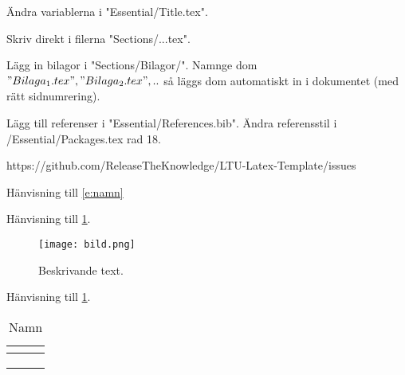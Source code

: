 Ändra variablerna i "Essential/Title.tex".

Skriv direkt i filerna "Sections/...tex".

Lägg in bilagor i "Sections/Bilagor/".
Namnge dom $"Bilaga_1.tex", "Bilaga_2.tex",..$ så läggs dom automatiskt in i dokumentet (med rätt sidnumrering).

Lägg till referenser i "Essential/References.bib".
Ändra referensstil i /Essential/Packages.tex rad 18.

https://github.com/ReleaseTheKnowledge/LTU-Latex-Template/issues



Hänvisning till \cref{e:namn}
\begin{equation} \label{e:namn}
\end{equation}


Hänvisning till \cref{f:namn}.
\begin{figure} [H]
    \centering 
    \texttt{[image: bild.png]}
    \caption{Beskrivande text.}
    \label{f:namn}
\end{figure}


Hänvisning till \cref{t:namn}.
\begin{table}[H]
\centering
\caption{Namn} \label{t:namn}
\begin{tabular}{@{} l l l @{}} \toprule
\textbf{} & \textbf{} & \textbf{} \\
\midrule
     &  &  \\
     &  &  \\
     &  &  \\
\bottomrule
\end{tabular}
\end{table}



